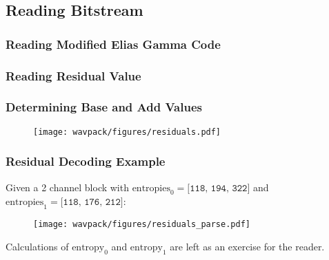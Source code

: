 
\subsection{Reading Bitstream}
\label{wavpack:read_bitstream}
{
  
}


\subsubsection{Reading Modified Elias Gamma Code}
\label{wavpack:read_egc}
{
  
}

\clearpage

\subsubsection{Reading Residual Value}
\label{wavpack:read_residual}
{
  
}

\clearpage

\subsubsection{Determining Base and Add Values}
\label{wavpack:decode_base_add}
{
  
}

\clearpage

\begin{figure}[h]
  \texttt{[image: wavpack/figures/residuals.pdf]}
\end{figure}

\subsubsection{Residual Decoding Example}
Given a 2 channel block with $\text{entropies}_0 = \texttt{[118, 194, 322]}$
and $\text{entropies}_1 = \texttt{[118, 176, 212]}$:

\begin{figure}[h]
\texttt{[image: wavpack/figures/residuals\_parse.pdf]}
\end{figure}
\par
\noindent
Calculations of $\text{entropy}_0$ and $\text{entropy}_1$
are left as an exercise for the reader.

